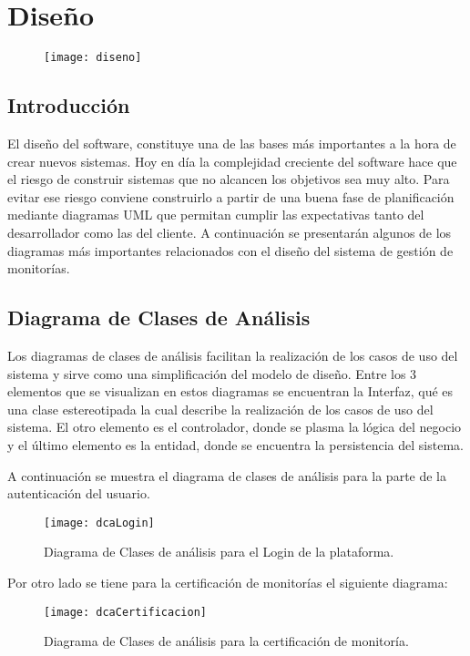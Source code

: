 \chapter{Diseño}
\begin{figure}[H]
	\centering
	\texttt{[image: diseno]}
    \centering
\end{figure}
\section{Introducción}

El diseño del software, constituye una de las bases más importantes a la hora de crear nuevos sistemas. Hoy en día la complejidad creciente del software hace que el riesgo de construir sistemas que no alcancen los objetivos sea muy alto. Para evitar ese riesgo conviene construirlo a partir de una buena fase de planificación mediante diagramas UML que permitan cumplir las expectativas tanto del desarrollador como las del cliente. A continuación se presentarán algunos de los diagramas más importantes relacionados con el diseño del sistema de gestión de monitorías.

\newpage

\section{Diagrama de Clases de Análisis}

Los diagramas de clases de análisis facilitan la realización de los casos de uso del sistema y sirve como una simplificación del modelo de diseño. Entre los 3 elementos que se visualizan en estos diagramas se encuentran la Interfaz, qué es una clase estereotipada la cual describe la realización de los casos de uso del sistema. El otro elemento es el controlador, donde se plasma la lógica del negocio y el último elemento es la entidad, donde se encuentra la persistencia del sistema. 

A continuación se muestra el diagrama de clases de análisis para la parte de la autenticación del usuario.
\begin{figure}[H]
	\centering
	\texttt{[image: dcaLogin]}
	\centering
	\caption{Diagrama de Clases de análisis para el Login de la plataforma.}
	\label{fig:dClaALogin}
\end{figure}

Por otro lado se tiene para la certificación de monitorías el siguiente diagrama:

\begin{figure}[H]
	\centering
	\texttt{[image: dcaCertificacion]}
	\centering
	\caption{Diagrama de Clases de análisis para la certificación de monitoría.}
	\label{fig:dcaCertificacion}
\end{figure}



